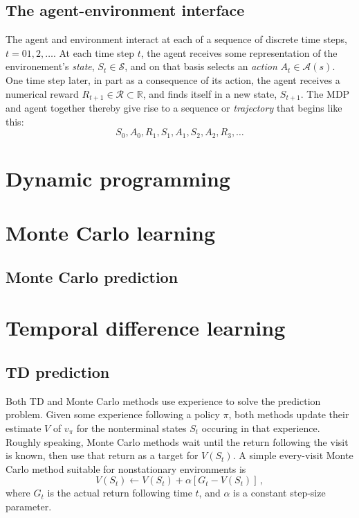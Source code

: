 \documentclass[12pt]{book}
\newcommand{\<}{\langle}
\renewcommand{\>}{\rangle}
\renewcommand{\S}{\mathcal{S}}
\newcommand{\A}{\mathcal{A}}
\newcommand{\cR}{\mathcal{R}}
\begin{document}
\section{The agent-environment interface}

The agent and environment interact at each of a sequence of discrete time steps, $t=01,2,\ldots$. At each time step $t$, the agent receives some representation of the environement's 
\emph{state}, $S_t\in\S$, and on that basis selects an \emph{action} $A_t\in\A(s)$. One time step later, in part as a consequence of its action, the agent receives a numerical reward $R_{t+1}\in\cR\subset \mathbb{R}$, and finds itself in a new state, $S_{t+1}$. The MDP and agent together thereby give rise to a sequence or \emph{trajectory} that begins like this:
\[
S_0,A_0,R_1,S_1,A_1,S_2,A_2,R_3,\ldots
\]

%
%
%

\chapter{Dynamic programming}

\chapter{Monte Carlo learning}

\section{Monte Carlo prediction}

\chapter{Temporal difference learning}

\section{TD prediction}\label{subsec:prediction}

Both TD and Monte Carlo methods use experience to solve the prediction problem. Given some experience following a policy $\pi$, both methods update their estimate $V$ of $v_\pi$ for the
nonterminal states $S_t$ occuring in that experience. Roughly speaking, Monte Carlo methods wait until the return following the visit is known, then use that return as a target for $V(S_t)$. 
A simple every-visit Monte Carlo method suitable for nonstationary environments is
\begin{equation}
V(S_t) \leftarrow V(S_t) + \alpha [G_t - V(S_t)]\,,
\end{equation}
where $G_t$ is the actual return following time $t$, and $\alpha$ is a constant step-size parameter.
\end{document}

